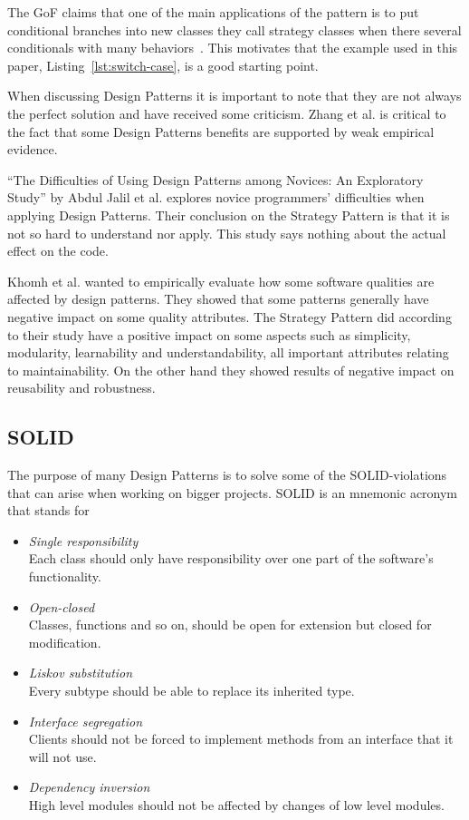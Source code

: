 \documentclass[conference, a4paper]{IEEEtran}
\begin{document}
The GoF claims that one of the main applications of the pattern is to put conditional branches into new classes they call strategy classes when there several conditionals with many behaviors~\cite{bibitem:GoF}. This motivates that the example used in this paper, Listing~\ref{lst:switch-case}, is a good starting point.

When discussing Design Patterns it is important to note that they are not always the perfect solution and have received some criticism. Zhang et al. is critical to the fact that some Design Patterns benefits are supported by weak empirical evidence.~\cite{bibitem:Zhang}

``The Difficulties of Using Design Patterns among Novices: An Exploratory Study'' by Abdul Jalil et al. explores novice programmers' difficulties when applying Design Patterns. Their conclusion on the Strategy Pattern is that it is not so hard to understand nor apply. This study says nothing about the actual effect on the code.~\cite{bibitem:Jalil}

Khomh et al. wanted to empirically evaluate how some software qualities are affected by design patterns. They showed that some patterns generally  have negative impact on some quality attributes. The Strategy Pattern did according to their study have a positive impact on some aspects such as simplicity, modularity, learnability and understandability, all important attributes relating to maintainability. On the other hand they showed results of negative impact on reusability and robustness.~\cite{bibitem:DPaSQ}

\subsection{SOLID}
The purpose of many Design Patterns is to solve some of the SOLID-violations that can arise when working on bigger projects. SOLID is an mnemonic acronym that stands for
\begin{itemize}
    \item \emph{Single responsibility} \\
    Each class should only have responsibility over one part of the software's functionality.
    \item \emph{Open-closed} \\
    Classes, functions and so on, should be open for extension but closed for modification.
    \item \emph{Liskov substitution} \\
    Every subtype should be able to replace its inherited type.
    \item \emph{Interface segregation} \\
    Clients should not be forced to implement methods from an interface that it will not use.
    \item \emph{Dependency inversion} \\
    High level modules should not be affected by changes of low level modules.
\end{itemize}
\end{document}
